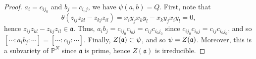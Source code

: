 \documentclass[12pt,letterpaper]{article}
\theoremstyle{definition}
\theoremstyle{remark}
\numberwithin{equation}{section}
\numberwithin{figure}{problem}
\let\Im\relax
\DeclareMathOperator{\Im}{im}
\DeclareMathOperator{\Ker}{Ker}
\newcommand{\PP}{\mathbb{P}}
\begin{document}
\begin{proof}
  $a_i = c_{ij_0}$ and $b_j = c_{i_0j}$, we have
  $\psi(a,b) = Q$. First, note that
  \begin{equation*}
    \theta(z_{ij} z_{kl} - z_{kj}z_{il}) = x_iy_jx_ky_l - x_ky_jx_iy_l = 0,
  \end{equation*}
  hence $z_{ij} z_{kl} - z_{kj}z_{il} \in \mathfrak{a}$. Thus, 
  $a_ib_j = c_{ij_0}c_{i_0j} = c_{ij}c_{i_0j_0}$
  since $c_{ij_0}c_{i_0j} = c_{ij}c_{i_0j_0}$, and so $[\cdots:a_ib_j:\cdots] =
  [\cdots : c_{ij} : \cdots]$.
  Finally, $Z(\mathfrak{a}) \subset \Im\psi$, and so 
  $\Im \psi = Z(\mathfrak{a})$. Moreover, this is a subvariety of $\PP^N$ since
  $\mathfrak{a}$ is prime, hence $Z(\mathfrak{a})$ is irreducible.
\end{proof}
\end{document}
